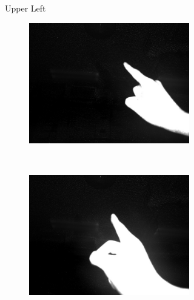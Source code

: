 \begin{figure}
\begin{subfigure}[b]{0.33\columnwidth}
\begin{subfigure}[b]{\columnwidth}
    \end{subfigure}
    \caption{Upper Left}
\end{subfigure}%
\begin{subfigure}[b]{0.33\columnwidth}
    \centering
    \begin{subfigure}[b]{\columnwidth}
    \centering
    \includegraphics[width=0.98\columnwidth]{ch5/figs/point_angle_1.png}
    \end{subfigure}
    \\
    \vspace{1pt}
    \begin{subfigure}[b]{\columnwidth}
    \centering
    \includegraphics[width=0.98\columnwidth]{ch5/figs/point_angle_2.png}
    \end{subfigure}

\end{subfigure}
\end{figure}

